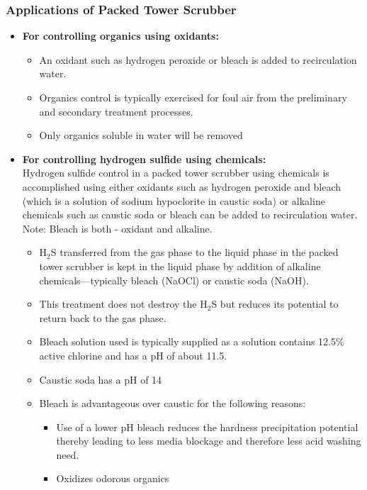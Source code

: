 \begin{enumerate}
\subsubsection{Applications of Packed Tower Scrubber}
		\begin{itemize}
			\item \textbf{For controlling organics using oxidants:}\\
\begin{itemize}
\item An oxidant such as hydrogen peroxide or bleach is added to recirculation water.  
\item Organics control is typically exercised for foul air from the preliminary and secondary treatment processes.\\
\item Only organics soluble in water will be removed
\end{itemize}
\item \textbf{For controlling hydrogen sulfide using chemicals:}\\
			
Hydrogen sulfide control in a packed tower scrubber using chemicals is accomplished using either oxidants such as hydrogen peroxide and bleach (which is a solution of sodium hypoclorite in caustic soda) or alkaline chemicals such as caustic soda or bleach can be added to recirculation water. 
Note:  Bleach is both - oxidant and alkaline.

\begin{itemize}
\item H$_2$S transferred from the gas phase to the liquid phase in the packed tower scrubber is kept in the liquid phase by addition of alkaline chemicals—typically bleach (NaOCl) or caustic soda (NaOH).
\item This treatment does not destroy the H$_2$S but reduces its potential to return back to the gas phase.
\item Bleach solution used is typically supplied as a solution contains 12.5\% active chlorine and has a pH of about 11.5.
\item Caustic soda has a pH of 14
\item Bleach is advantageous over caustic for the following reasons:
\begin{itemize}
\item Use of a lower pH bleach reduces the hardness precipitation potential thereby leading to less media blockage and therefore less acid washing need.
\item Oxidizes odorous organics
\end{itemize}
\end{itemize}


\end{itemize}
\end{enumerate}
